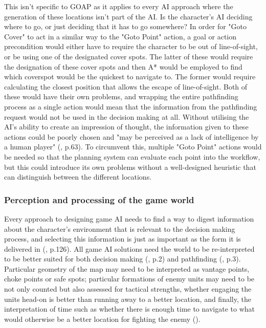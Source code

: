 \documentclass[11pt, a4paper]{article}
\begin{document}
This isn't specific to GOAP as it applies to every AI approach where the generation of these locations isn't part of the AI. Is the character's AI deciding where to go, or just deciding that it has to go somewhere? In order for "Goto Cover" to act in a similar way to the "Goto Point" action, a goal or action precondition would either have to require the character to be out of line-of-sight, or be using one of the designated cover spots. The latter of these would require the designation of these cover spots and then A* would be employed to find which coverspot would be the quickest to navigate to. The former would require calculating the closest position that allows the escape of line-of-sight. Both of these would have their own problems, and wrapping the entire pathfinding process as a single action would mean that the information from the pathfinding request would not be used in the decision making at all. Without utilising the AI's ability to create an impression of thought, the information given to these actions could be poorly chosen and "may be perceived as a lack of intelligence by a human player" (\cite{graham2003pathfinding}, p.63). To circumvent this, multiple "Goto Point" actions would be needed so that the planning system can evaluate each point into the workflow, but this could introduce its own problems without a well-designed heuristic that can distinguish between the different locations.

\subsubsection{Perception and processing of the game world}

Every approach to designing game AI needs to find a way to digest information about the character's environment that is relevant to the decision making process, and selecting this information is just as important as the form it is delivered in (\cite{cui2011based}, p.126). All game AI solutions need the world to be re-interpreted to be better suited for both decision making (\cite{buro2004call}, p.2) and pathfinding (\cite{diller2004behavior}, p.3). Particular geometry of the map may need to be interpreted as vantage points, choke points or safe spots; particular formations of enemy units may need to be not only counted but also assessed for tactical strengths, whether engaging the units head-on is better than running away to a better location, and finally, the interpretation of time such as whether there is enough time to navigate to what would otherwise be a better location for fighting the enemy (\cite{buro2004call}).
\end{document}
